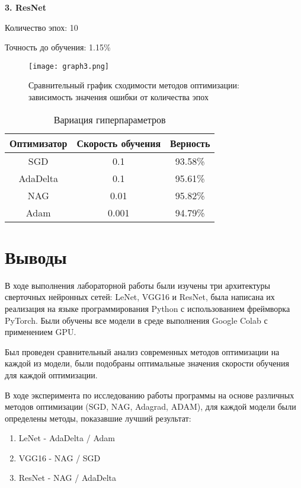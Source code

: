 \documentclass[a4paper, 14pt]{extarticle}
\begin{document}
\textbf{3. ResNet}

Количество эпох: 10

Точность до обучения: 1.15\%

\begin{figure}[h]
    \centering
    \texttt{[image: graph3.png]}
    \caption{Сравнительный график сходимости методов оптимизации:\\ зависимость значения ошибки от количества эпох}
    \label{fig:enter-label5}
\end{figure}

\begin{table}[h]
\centering
\caption{Вариация гиперпараметров}
\begin{tabular}{|c|c|c|}
\hline
Оптимизатор & Скорость обучения & Верность \\
\hline
SGD & 0.1 & 93.58\% \\
AdaDelta & 0.1 & 95.61\% \\
NAG & 0.01 & 95.82\% \\
Adam & 0.001 & 94.79\% \\
\hline
\end{tabular}
\end{table}

\section{Выводы}\label{Sect::sum}

В ходе выполнения лабораторной работы были изучены три архитектуры сверточных нейронных сетей: LeNet, VGG16 и ResNet, была написана их реализация на языке программирования Python с использованием фреймворка PyTorch. Были обучены все модели в среде выполнения Google Colab с применением GPU.

Был проведен сравнительный анализ современных методов оптимизации на каждой из модели, были подобраны оптимальные значения скорости обучения для каждой оптимизации. 

В ходе эксперимента по исследованию работы программы на основе различных методов оптимизации (SGD, NAG, Adagrad, ADAM), для каждой модели были определены методы, показавшие лучший результат:
\begin{enumerate}
    \item LeNet - AdaDelta / Adam
    \item VGG16 - NAG / SGD
    \item ResNet - NAG / AdaDelta
\end{enumerate}
\end{document}
